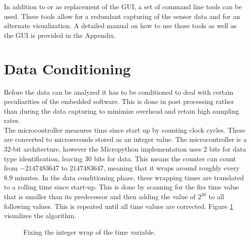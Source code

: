 In addition to or as replacement of the GUI, a set of command line tools can be used. These tools allow for a redundant capturing of the sensor data and for an alternate visualization. A detailed manual on how to use those tools as well as the GUI is provided in the Appendix.

\section{Data Conditioning}

Before the data can be analyzed it has to be conditioned to deal with certain peculiarities of the embedded software. This is done in post processing rather than during the data capturing to minimize overhead and retain high sampling rates.\\

The microcontroller measures time since start up by counting clock cycles. These are converted to microseconds stored as an integer value. The microcontroller is a 32-bit architecture, however the Micropython implementation uses 2 bits for data type identification, leaving 30 bits for data. This means the counter can count from $-2147483647$ to $2147483647$, meaning that it wraps around roughly every $8.9$ minutes. In the data conditioning phase, these wrapping times are translated to a rolling time since start-up. This is done by scanning for the firs time value that is smaller than its predecessor and then adding the value of $2^{30}$ to all following values. This is repeated until all time values are corrected. Figure \ref{fig:wrap} visualizes the algorithm.\\

\begin{figure}
	\begin{center}
		\caption{Fixing the integer wrap of the time variable.}
		\label{fig:wrap}
	\end{center}
\end{figure}